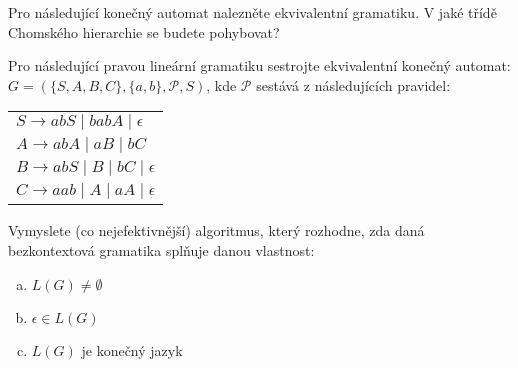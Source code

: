 \documentclass[a4paper,12pt]{amsart}
\begin{document}
\begin{problem}
 
    Pro následující konečný automat nalezněte ekvivalentní gramatiku. V jaké třídě Chomského hierarchie se budete pohybovat?

	\begin{center}
    \end{center}

\end{problem}


\medskip\begin{problem} 
    
    Pro následující pravou lineární gramatiku sestrojte ekvivalentní konečný automat: $G=(\{S,A,B,C\},\{a,b\},\mathcal P,S)$, kde $\mathcal P$ sestává z následujících pravidel: 

    \medskip

    \begin{center}
        \begin{tabular}{l}
        $S\rightarrow abS\mid babA\mid \epsilon $\\
        $A\rightarrow abA\mid aB \mid  bC$\\
        $B\rightarrow abS\mid B\mid bC\mid \epsilon $\\
        $C\rightarrow aab\mid A\mid aA\mid \epsilon $
        \end{tabular}
    \end{center}

\end{problem}


\medskip\begin{problem}
    Vymyslete (co nejefektivnější) algoritmus, který rozhodne, zda daná bezkontextová gramatika splňuje danou vlastnost:

    \medskip
    
    \begin{enumerate}[(a)]
        \item $L(G)\neq\emptyset$
        \item $\epsilon\in L(G)$
        \item $L(G)$ je konečný jazyk
    \end{enumerate}

\end{problem}
\end{document}
